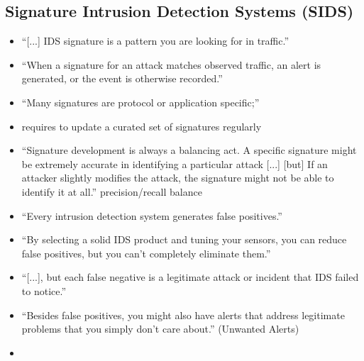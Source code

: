 	\subsection{Signature Intrusion Detection Systems (SIDS)}
		\begin{itemize}
			\item \enquote{[...] IDS signature is a pattern you are looking for in traffic.} \parencite{Northcutt2005}
			\item \enquote{When a signature for an attack matches observed traffic, an alert is generated, or the event is otherwise recorded.} \parencite{Northcutt2005}
			\item \enquote{Many signatures are protocol or application specific;} \parencite{Northcutt2005}
			\item requires to update a curated set of signatures regularly \parencite{Northcutt2005}
			\item \enquote{Signature development is always a balancing act. A specific signature might be extremely accurate in identifying a particular attack [...] [but] If an attacker slightly modifies the attack, the signature might not be able to identify it at all.} \parencite{Northcutt2005}
				\subitem precision/recall balance
			\item \enquote{Every intrusion detection system generates false positives.} \parencite[p.~205]{Northcutt2005}
			\item \enquote{By selecting a solid IDS product and tuning your sensors, you can reduce false positives, but you can't completely eliminate them.} \parencite[p.~205]{Northcutt2005}
			\item \enquote{[...], but each false negative is a legitimate attack or incident that IDS failed to notice.} \parencite[p.~206]{Northcutt2005}
			\item \enquote{Besides false positives, you might also have alerts that address legitimate problems that you simply don't care about.} (Unwanted Alerts) \parencite[p.~206]{Northcutt2005}
			\item 
		\end{itemize} 
	
